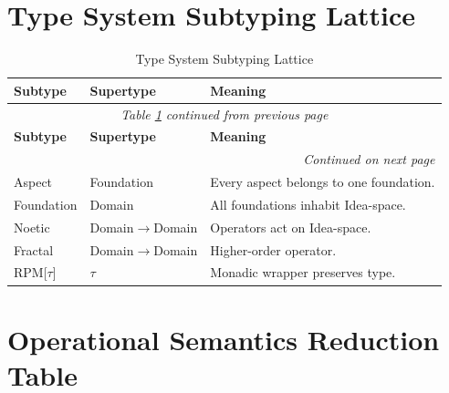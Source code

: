 \section{Type System Subtyping Lattice}

\renewcommand{\arraystretch}{1.25}
\small
\begin{longtable}{p{2cm}|p{2.5cm}|p{6.5cm}}
\caption{Type System Subtyping Lattice}
\label{tab:type-lattice} \\
\toprule
\textbf{Subtype}
& \textbf{Supertype}
& \textbf{Meaning}
\\
\midrule
\endfirsthead
\multicolumn{3}{c}{\textit{Table \ref{tab:type-lattice} continued from previous page}} \\
\toprule
\textbf{Subtype}
& \textbf{Supertype}
& \textbf{Meaning}
\\
\midrule
\endhead
\midrule
\multicolumn{3}{r}{\textit{Continued on next page}} \\
\endfoot
\bottomrule
\endlastfoot

Aspect & Foundation & Every aspect belongs to one foundation. \\

Foundation & Domain & All foundations inhabit Idea-space. \\

Noetic & Domain$\to$Domain & Operators act on Idea-space. \\

Fractal & Domain$\to$Domain & Higher-order operator. \\

RPM[$\tau$] & $\tau$ & Monadic wrapper preserves type. \\

\end{longtable}
\normalsize

\section{Operational Semantics Reduction Table}

